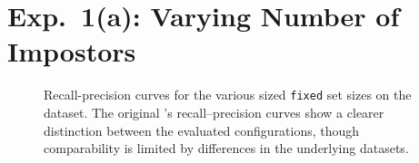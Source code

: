 \section{Exp.\ 1(a): Varying Number of Impostors}
\label{app:exp_student_dif_n}


\begin{figure}[H]
    \centering
    
    \caption[Recall-precision curves for the various sized \imp{} set sizes]{Recall-precision curves for the various sized \texttt{fixed} \imp{} set sizes on the \dataStudent{} dataset.
    The original \impAppr{}’s recall–precision curves show a clearer distinction between the evaluated configurations, though comparability is limited by differences in the underlying datasets.
    }
    \label{fig:student_essays_dif_n}
\end{figure}